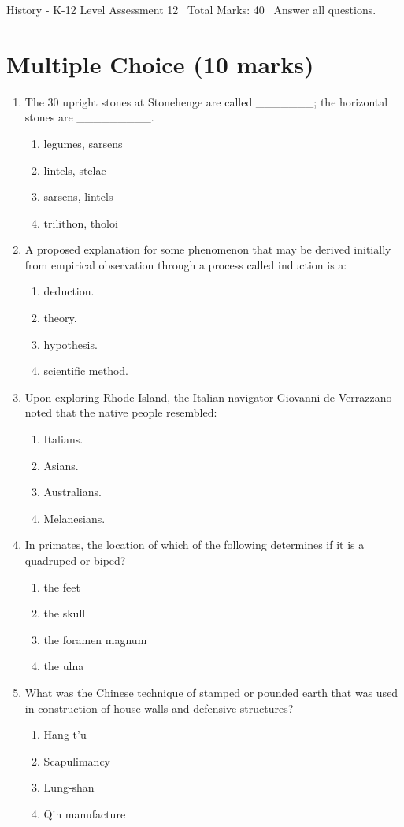 \documentclass[12pt]{article}
\begin{document}
\begin{center}
History - K-12 Level Assessment 12 \
Total Marks: 40 \
Answer all questions.
\end{center}

\section*{Multiple Choice (10 marks)}
\begin{enumerate}[label=\arabic*.]
\item The 30 upright stones at Stonehenge are called \_\_\_\_\_\_\_; the horizontal stones are \_\_\_\_\_\_\_\_\_.
\begin{enumerate}[label=(\alph*)]
    \item legumes, sarsens
    \item lintels, stelae
    \item sarsens, lintels
    \item trilithon, tholoi
\end{enumerate}
\item A proposed explanation for some phenomenon that may be derived initially from empirical observation through a process called induction is a:
\begin{enumerate}[label=(\alph*)]
    \item deduction.
    \item theory.
    \item hypothesis.
    \item scientific method.
\end{enumerate}
\item Upon exploring Rhode Island, the Italian navigator Giovanni de Verrazzano noted that the native people resembled:
\begin{enumerate}[label=(\alph*)]
    \item Italians.
    \item Asians.
    \item Australians.
    \item Melanesians.
\end{enumerate}
\item In primates, the location of which of the following determines if it is a quadruped or biped?
\begin{enumerate}[label=(\alph*)]
    \item the feet
    \item the skull
    \item the foramen magnum
    \item the ulna
\end{enumerate}
\item What was the Chinese technique of stamped or pounded earth that was used in construction of house walls and defensive structures?
\begin{enumerate}[label=(\alph*)]
    \item Hang-t'u
    \item Scapulimancy
    \item Lung-shan
    \item Qin manufacture
\end{enumerate}
\end{enumerate}
\end{document}
